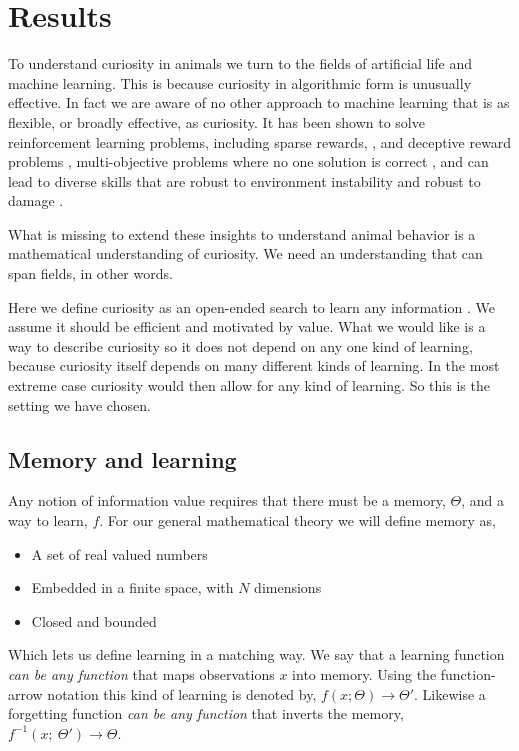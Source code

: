 \section{Results} 
To understand curiosity in animals we turn to the fields of artificial life and machine learning. This is because curiosity in algorithmic form is unusually effective. In fact we are aware of no other approach to machine learning that is as flexible, or broadly effective, as curiosity. It has been shown to solve reinforcement learning problems, including sparse rewards, \citep{Schmidhuber1991,Pathak2017,Stanton2018}, and deceptive reward problems \citep{Lehman2011}, multi-objective problems where no one solution is correct \citep{Mouret2011b,Fister2019}, and can lead to diverse skills \citep{Colas2020} that are robust to environment instability \citep{Mouret2015} and robust to damage \citep{Cully2015}.

What is missing to extend these insights to understand animal behavior is a mathematical understanding of curiosity. We need an understanding that can span fields, in other words. 

Here we define curiosity as an open-ended search to learn any information \citep{Kidd2015}. We assume it should be efficient and motivated by value. What we would like is a way to describe curiosity so it does not depend on any one kind of learning, because curiosity itself depends on many different kinds of learning. In the most extreme case curiosity would then allow for any kind of learning. So this is the setting we have chosen. 

\subsection{Memory and learning} 
Any notion of information value requires that there must be a memory, $\Theta$, and a way to learn, $f$. For our general mathematical theory we will define memory as,

\begin{itemize}
\item A set of real valued numbers
\item Embedded in a finite space, with $N$ dimensions 
\item Closed and bounded
\end{itemize}

Which lets us define learning in a matching way. We say that a learning function \textit{can be any function} that maps observations $x$ into memory. Using the function-arrow notation this kind of learning is denoted by, $f(x;\Theta) \rightarrow \Theta'$. Likewise a forgetting function \textit{can be any function} that inverts the memory, $f^{-1}(x;\ \Theta') \rightarrow \Theta$. 

